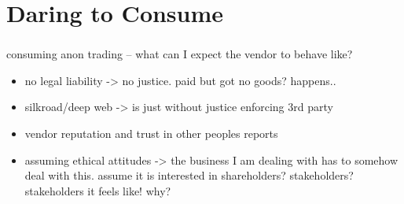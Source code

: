 \section{Daring to Consume}

\begin{frame}
    \frametitle{\insertsection}
    consuming anon trading -- what can I expect the vendor to behave like?
    \begin{itemize}
        \item no legal liability -> no justice. paid but got no goods? happens..
        \item silkroad/deep web -> is just without justice enforcing 3rd party
        \item vendor reputation and trust in other peoples reports
        \item assuming ethical attitudes -> the business I am dealing with has to somehow deal with this. assume it is interested in shareholders? stakeholders? stakeholders it feels like! why? 
    \end{itemize}
\end{frame}